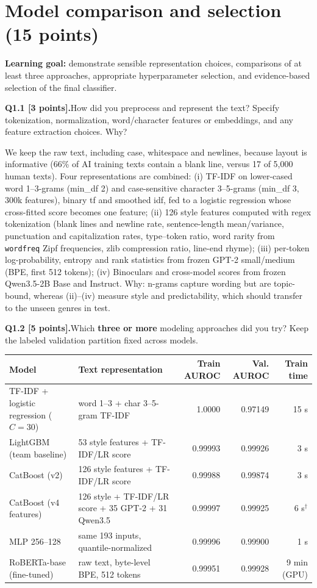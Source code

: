 \documentclass[11pt,letterpaper]{article}
\newcommand{\question}[2]{\needspace{4\baselineskip}\par\addvspace{0.45em}\noindent\textbf{#1}\quad #2\par\nobreak\vspace{0.1em}}
\begin{document}
\newpage
\section{Model comparison and selection (15 points)}
\textbf{Learning goal:} demonstrate sensible representation choices, comparisons of at least three approaches, appropriate hyperparameter selection, and evidence-based selection of the final classifier.

\question{Q1.1 [3 points].}{How did you preprocess and represent the text? Specify tokenization, normalization, word/character features or embeddings, and any feature extraction choices. Why?}
We keep the raw text, including case, whitespace and newlines, because layout is informative (66\% of AI training texts contain a blank line, versus 17 of 5,000 human texts). Four representations are combined: (i) TF-IDF on lower-cased word 1--3-grams (min\_df 2) and case-sensitive character 3--5-grams (min\_df 3, 300k features), binary tf and smoothed idf, fed to a logistic regression whose cross-fitted score becomes one feature; (ii) 126 style features computed with regex tokenization (blank lines and newline rate, sentence-length mean/variance, punctuation and capitalization rates, type--token ratio, word rarity from \texttt{wordfreq} Zipf frequencies, zlib compression ratio, line-end rhyme); (iii) per-token log-probability, entropy and rank statistics from frozen GPT-2 small/medium (BPE, first 512 tokens); (iv) Binoculars and cross-model scores from frozen Qwen3.5-2B Base and Instruct. Why: n-grams capture wording but are topic-bound, whereas (ii)--(iv) measure style and predictability, which should transfer to the unseen genres in test.
\question{Q1.2 [5 points].}{Which \textbf{three or more} modeling approaches did you try? Keep the labeled validation partition fixed across models.}
\begin{tabularx}{\linewidth}{@{}p{1.24in}Yrrr@{}}\toprule
Model & Text representation & Train AUROC & Val. AUROC & Train time \\ \midrule
TF-IDF + logistic regression ($C=30$) & word 1--3 + char 3--5-gram TF-IDF & 1.0000 & 0.97149 & 15 s \\
LightGBM (team baseline) & 53 style features + TF-IDF/LR score & 0.99993 & 0.99926 & 3 s \\
CatBoost (v2) & 126 style features + TF-IDF/LR score & 0.99988 & 0.99874 & 3 s \\
CatBoost (v4 features) & 126 style + TF-IDF/LR score + 35 GPT-2 + 31 Qwen3.5 & 0.99997 & 0.99925 & 6 s$^\dagger$ \\
MLP 256--128 & same 193 inputs, quantile-normalized & 0.99996 & 0.99900 & 1 s \\
RoBERTa-base (fine-tuned) & raw text, byte-level BPE, 512 tokens & 0.99951 & 0.99928 & 9 min (GPU) \\
\bottomrule\end{tabularx}
\end{document}
